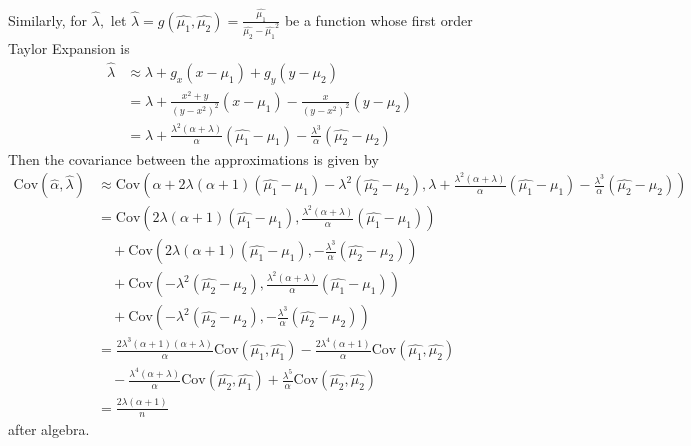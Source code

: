 \documentclass{article}
\newcommand{\cov}{\mathrm{Cov}}
\begin{document}
\begin{enumerate}
\begin{enumerate}[(a)]
\begin{soln}
					Similarly, for $\hat{\lambda},$ let $\hat{\lambda}=g(\hat{\mu_1}, \hat{\mu_2})=\frac{\hat{\mu_1}}{\hat{\mu_2}-\hat{\mu_1}^2}$ be a function whose first order Taylor Expansion is 
					\begin{align*}
						\hat{\lambda} &\approx \lambda+g_x (x-\mu_1)+g_y(y-\mu_2) \\
						&= \lambda + \frac{x^2+y}{(y-x^2)^2}(x-\mu_1) - \frac{x}{(y-x^2)^2}(y-\mu_2) \\
						&= \lambda+\frac{\lambda^2(\alpha+\lambda)}{\alpha}(\hat{\mu_1}-\mu_1) - \frac{\lambda^3}{\alpha}(\hat{\mu_2}-\mu_2)
					\end{align*}
					Then the covariance between the approximations is given by 
					\begin{align*}
						\cov(\hat{\alpha}, \hat{\lambda}) &\approx \cov\left( \alpha + 2\lambda(\alpha+1)(\hat{\mu_1}-\mu_1) - \lambda^2(\hat{\mu_2}-\mu_2),  \lambda+\frac{\lambda^2(\alpha+\lambda)}{\alpha}(\hat{\mu_1}-\mu_1) - \frac{\lambda^3}{\alpha}(\hat{\mu_2}-\mu_2)\right) \\
						&= \cov\left(2\lambda(\alpha+1)(\hat{\mu_1}-\mu_1), \frac{\lambda^2(\alpha+\lambda)}{\alpha}(\hat{\mu_1}-\mu_1)\right) \\
						&\quad + \cov\left( 2\lambda(\alpha+1)(\hat{\mu_1}-\mu_1), -\frac{\lambda^3}{\alpha}(\hat{\mu_2}-\mu_2) \right) \\
						&\quad + \cov\left( -\lambda^2(\hat{\mu_2}-\mu_2), \frac{\lambda^2(\alpha+\lambda)}{\alpha}(\hat{\mu_1}-\mu_1) \right) \\
						&\quad + \cov\left( -\lambda^2(\hat{\mu_2}-\mu_2), -\frac{\lambda^3}{\alpha}(\hat{\mu_2}-\mu_2) \right) \\
						&= \frac{2\lambda^3(\alpha+1)(\alpha+\lambda)}{\alpha}\cov(\hat{\mu_1}, \hat{\mu_1}) - \frac{2\lambda^4(\alpha+1)}{\alpha}\cov(\hat{\mu_1}, \hat{\mu_2}) \\
						&\quad-\frac{\lambda^4(\alpha+\lambda)}{\alpha}\cov(\hat{\mu_2}, \hat{\mu_1}) + \frac{\lambda^5}{\alpha}\cov(\hat{\mu_2}, \hat{\mu_2}) \\
						&= \frac{2\lambda(\alpha+1)}{n}
					\end{align*} after algebra.

				\end{soln}

		\end{enumerate}


\end{enumerate}
\end{document}
